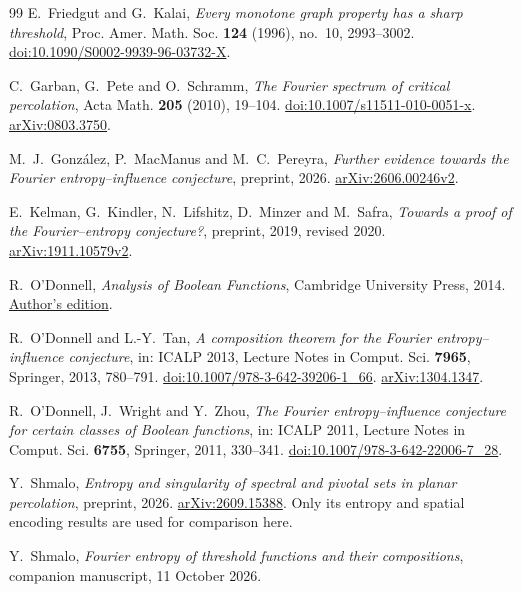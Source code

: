 \begin{thebibliography}{99}
E.~Friedgut and G.~Kalai,
\emph{Every monotone graph property has a sharp threshold},
Proc. Amer. Math. Soc. \textbf{124} (1996), no.~10, 2993--3002.
\href{https://doi.org/10.1090/S0002-9939-96-03732-X}{doi:10.1090/S0002-9939-96-03732-X}.

C.~Garban, G.~Pete and O.~Schramm,
\emph{The Fourier spectrum of critical percolation},
Acta Math. \textbf{205} (2010), 19--104.
\href{https://doi.org/10.1007/s11511-010-0051-x}{doi:10.1007/s11511-010-0051-x}.
\href{https://arxiv.org/abs/0803.3750}{arXiv:0803.3750}.

M.~J.~Gonz\'alez, P.~MacManus and M.~C.~Pereyra,
\emph{Further evidence towards the Fourier entropy--influence conjecture},
preprint, 2026.
\href{https://arxiv.org/abs/2606.00246v2}{arXiv:2606.00246v2}.

E.~Kelman, G.~Kindler, N.~Lifshitz, D.~Minzer and M.~Safra,
\emph{Towards a proof of the Fourier--entropy conjecture?},
preprint, 2019, revised 2020.
\href{https://arxiv.org/abs/1911.10579v2}{arXiv:1911.10579v2}.

R.~O'Donnell,
\emph{Analysis of Boolean Functions}, Cambridge University Press, 2014.
\href{https://www.cs.cmu.edu/~odonnell/papers/Analysis-of-Boolean-Functions-by-Ryan-ODonnell.pdf}{Author's edition}.

R.~O'Donnell and L.-Y.~Tan,
\emph{A composition theorem for the Fourier entropy--influence conjecture},
in: ICALP 2013, Lecture Notes in Comput. Sci. \textbf{7965}, Springer, 2013, 780--791.
\href{https://doi.org/10.1007/978-3-642-39206-1_66}{doi:10.1007/978-3-642-39206-1\_66}.
\href{https://arxiv.org/abs/1304.1347}{arXiv:1304.1347}.

R.~O'Donnell, J.~Wright and Y.~Zhou,
\emph{The Fourier entropy--influence conjecture for certain classes of Boolean functions},
in: ICALP 2011, Lecture Notes in Comput. Sci. \textbf{6755}, Springer, 2011, 330--341.
\href{https://doi.org/10.1007/978-3-642-22006-7_28}{doi:10.1007/978-3-642-22006-7\_28}.

Y.~Shmalo,
\emph{Entropy and singularity of spectral and pivotal sets in planar percolation},
preprint, 2026.
\href{https://arxiv.org/abs/2609.15388}{arXiv:2609.15388}.
Only its entropy and spatial encoding results are used for comparison here.

Y.~Shmalo,
\emph{Fourier entropy of threshold functions and their compositions},
companion manuscript, 11 October 2026.


\end{thebibliography}
